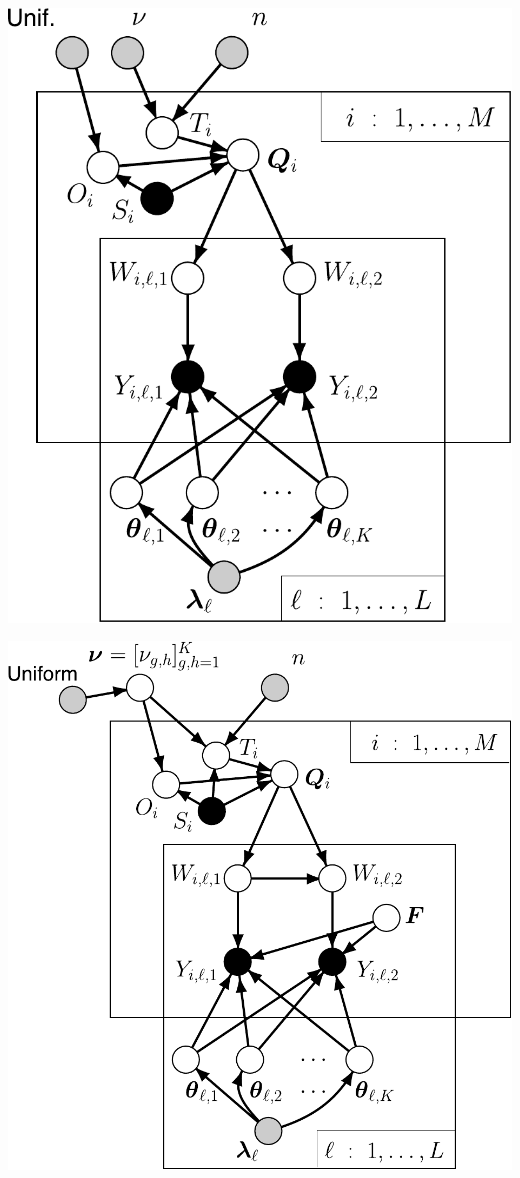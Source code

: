 \begin{minipage}{.47\textwidth}
\vfill
\hfill\includegraphics*[width=.95\textwidth]{illus/PritchPriorPopDuo.pdf}
\end{minipage}
\hfill
\begin{minipage}{.51\textwidth}
\vfill
\hfill\includegraphics*[width=.95\textwidth]{illus/WilsonRannala.pdf}
\vfill
\end{minipage}




